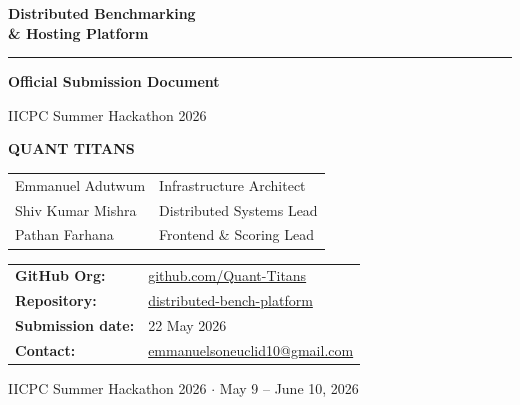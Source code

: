 \documentclass[12pt,a4paper]{article}
\begin{document}
\begin{titlepage}
  \centering
  \vspace*{2cm}

  {\Huge\bfseries\color{primary} Distributed Benchmarking\\[0.3em]
   \& Hosting Platform\par}

  \vspace{1cm}
  {\large\color{accent}\rule{0.6\linewidth}{2pt}\par}
  \vspace{0.8cm}

  {\Large\bfseries\color{primary} Official Submission Document\par}
  \vspace{0.4cm}
  {\large IICPC Summer Hackathon 2026\par}

  \vspace{1.5cm}

  \begin{tcolorbox}[colback=primary!5, colframe=primary, width=0.7\linewidth,
                    left=12pt, right=12pt, top=10pt, bottom=10pt]
    \centering
    {\LARGE\bfseries\color{primary} QUANT TITANS\par}
    \vspace{0.5em}
    \begin{tabular}{ll}
      Emmanuel Adutwum    & Infrastructure Architect \\
      Shiv Kumar Mishra   & Distributed Systems Lead \\
      Pathan Farhana      & Frontend \& Scoring Lead \\
    \end{tabular}
  \end{tcolorbox}

  \vspace{1.5cm}

  \begin{tabular}{ll}
    \textbf{GitHub Org:}   & \href{https://github.com/Quant-Titans}{github.com/Quant-Titans} \\[4pt]
    \textbf{Repository:}   & \href{https://github.com/Quant-Titans/distributed-bench-platform}{%
                              distributed-bench-platform} \\[4pt]
    \textbf{Submission date:} & 22 May 2026 \\[4pt]
    \textbf{Contact:}      & \href{mailto:emmanuelsoneuclid10@gmail.com}{emmanuelsoneuclid10@gmail.com} \\
  \end{tabular}

  \vfill
  {\small\color{muted} IICPC Summer Hackathon 2026 $\cdot$ May 9 -- June 10, 2026\par}
\end{titlepage}
\end{document}

